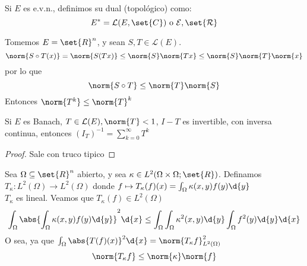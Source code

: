 \documentclass{notetaking}
\begin{document}
\begin{defn}[Dual]
    Si \(E\) es e.v.n., definimos su dual (topológico) como:
    \[
        E^*=\mathcal{L}(E,\set{C})\text{ o }\mathcal{E,\set{R}}
    \]
\end{defn}

\begin{ejm}
    Tomemos \(E=\set{R}^n\), y sean \(S,T\in\mathcal{L}(E)\).
    \[
        \norm{S\circ T(x)}=\norm{S(Tx)}\leq\norm{S}\norm{Tx}\leq\norm{S}\norm{T}\norm{x}
    \]
    por lo que
    \[
        \norm{S\circ T}\leq\norm{T}\norm{S}
    \]
    Entonces \(\norm{T^k}\leq\norm{T}^k\)
\end{ejm}
\begin{prp}
    Si \(E\) es Banach, \(T\in\mathcal{L}(E),\norm{T}<1\), \(I-T\) es invertible, con inversa continua, entonces \((I_T)^{-1}=\sum_{k=0}^\infty T^k\)
\end{prp}
\begin{proof}
    Sale con truco tipico
\end{proof}

\begin{ejm}
    Sea \(\Omega\subseteq\set{R}^n\) abierto, y sea \(\kappa\in L^2(\Omega\times\Omega;\set{R})\). Definamos \(T_\kappa:L^2(\Omega)\rightarrow L^2(\Omega)\) donde \(f\mapsto T_\kappa(f)(x)=\int_\Omega \kappa(x,y)f(y)\d{y}\)\\
    \(T_\kappa\) es lineal. Veamos que \(T_\kappa(f)\in L^2(\Omega)\)
    \[
        \int_\Omega\abs{\int_\Omega\kappa(x,y)f(y)\d{y}}^2\d{x}\leq\int_\Omega\int_\Omega\kappa^2(x,y)\d{y}\int_\Omega f^2(y)\d{y}\d{x}
    \]
    O sea, ya que \(\int_\Omega\abs{T(f)(x)}^2\d{x}=\norm{T_\kappa f}^2_{L^2(\Omega)}\)
    \[
        \norm{T_\kappa f}\leq\norm{\kappa}\norm{f}
    \]
\end{ejm}
\end{document}
